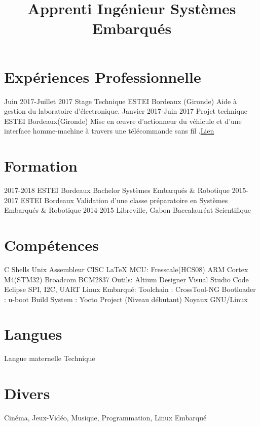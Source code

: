 \documentclass[10pts,a4paper,sans]{moderncv}
\title{Apprenti Ingénieur Systèmes Embarqués }
\begin{document}
\maketitle

\section{Exp\'{e}riences Professionnelle}
\cventry{} {Juin 2017-Juillet 2017} {Stage Technique} {ESTEI} {Bordeaux (Gironde)} {Aide à gestion du laboratoire d’électronique.} {}
\cventry{} {Janvier 2017-Juin 2017} {Projet technique} {ESTEI} {Bordeaux(Gironde)} {Mise en œuvre d'actionneur du véhicule et d'une interface homme-machine à travers une télécommande sans fil .\href{https://github.com/jorisoffouga/projet_vehicule_interactif_B2}{Lien}}
{} {}

\section{Formation}
\cventry{} {2017-2018} {ESTEI} {Bordeaux} {Bachelor Systèmes Embarqués \& Robotique} {}
\cventry{} {2015-2017} {ESTEI} {Bordeaux} {Validation d'une classe préparatoire en Systèmes Embarqués \& Robotique} {}
\cventry{} {2014-2015} {Libreville, Gabon} {Baccalauréat Scientifique} {} {}

\section{Compétences}
 {C \newline {} Shells Unix \newline {} Assembleur CISC \newline {} \LaTeX} {MCU:} {Fresscale(HCS08) \newline {} ARM Cortex M4(STM32)}
 {Broadcom BCM2837} {Outils:} {Altium Designer \newline {} Visual Studio Code \newline {} Eclipse}
 {SPI, I2C, UART} {Linux Embarqu\'{e}:}{ 
	Toolchain : CrossTool-NG
	\newline {} Bootloader : u-boot
	\newline {} Build System : Yocto Project (Niveau débutant)
	\newline {} Noyaux GNU/Linux
}

\section{Langues}
 {Langue maternelle}
 {Technique}
 
\newpage
\section{Divers}
 {Cinéma, Jeux-Vidéo, Musique, Programmation, Linux Embarqué}
\end{document}
